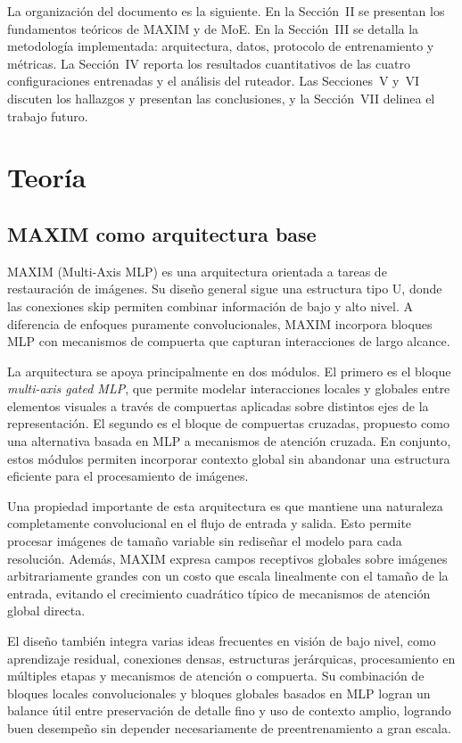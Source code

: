 \documentclass[aps,prl,twocolumn,groupedaddress]{revtex4-2}
\begin{document}
La organización del documento es la siguiente. En la Sección~II se presentan los fundamentos teóricos de MAXIM y de MoE. En la Sección~III se detalla la metodología implementada: arquitectura, datos, protocolo de entrenamiento y métricas. La Sección~IV reporta los resultados cuantitativos de las cuatro configuraciones entrenadas y el análisis del ruteador. Las Secciones~V y~VI discuten los hallazgos y presentan las conclusiones, y la Sección~VII delinea el trabajo futuro.

\section{Teoría}

\subsection{MAXIM como arquitectura base}

MAXIM (Multi-Axis MLP) es una arquitectura orientada a tareas de restauración de imágenes. Su diseño general sigue una estructura tipo U, donde las conexiones skip permiten combinar información de bajo y alto nivel. A diferencia de enfoques puramente convolucionales, MAXIM incorpora bloques MLP con mecanismos de compuerta que capturan interacciones de largo alcance.

La arquitectura se apoya principalmente en dos módulos. El primero es el bloque \textit{multi-axis gated MLP}, que permite modelar interacciones locales y globales entre elementos visuales a través de compuertas aplicadas sobre distintos ejes de la representación. El segundo es el bloque de compuertas cruzadas, propuesto como una alternativa basada en MLP a mecanismos de atención cruzada. En conjunto, estos módulos permiten incorporar contexto global sin abandonar una estructura eficiente para el procesamiento de imágenes.

Una propiedad importante de esta arquitectura es que mantiene una naturaleza completamente convolucional en el flujo de entrada y salida. Esto permite procesar imágenes de tamaño variable sin rediseñar el modelo para cada resolución. Además, MAXIM expresa campos receptivos globales sobre imágenes arbitrariamente grandes con un costo que escala linealmente con el tamaño de la entrada, evitando el crecimiento cuadrático típico de mecanismos de atención global directa.

El diseño también integra varias ideas frecuentes en visión de bajo nivel, como aprendizaje residual, conexiones densas, estructuras jerárquicas, procesamiento en múltiples etapas y mecanismos de atención o compuerta. Su combinación de bloques locales convolucionales y bloques globales basados en MLP logran un balance útil entre preservación de detalle fino y uso de contexto amplio, logrando buen desempeño sin depender necesariamente de preentrenamiento a gran escala.
\end{document}

